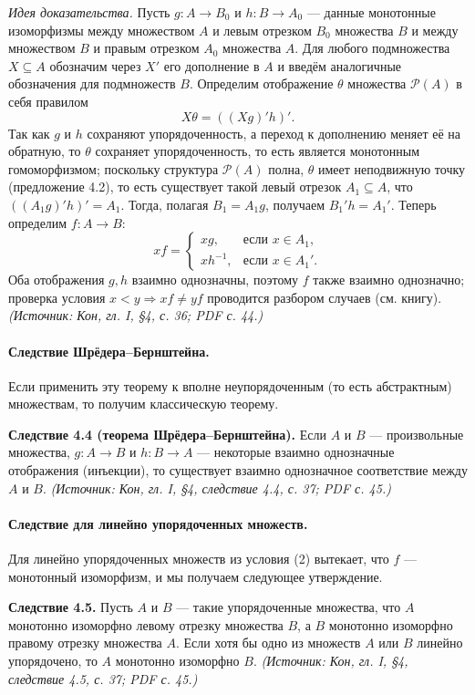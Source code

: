 \documentclass[a4paper,12pt]{article}
\begin{document}
\emph{Идея доказательства.} Пусть \(g\colon A\to B_0\) и \(h\colon B\to A_0\) — данные монотонные изоморфизмы между множеством \(A\) и левым отрезком \(B_0\) множества \(B\) и между множеством \(B\) и правым отрезком \(A_0\) множества \(A\). Для любого подмножества \(X\subseteq A\) обозначим через \(X'\) его дополнение в \(A\) и введём аналогичные обозначения для подмножеств \(B\). Определим отображение \(\theta\) множества \(\mathcal{P}(A)\) в себя правилом
\[
X\theta=((Xg)'h)'.
\]
Так как \(g\) и \(h\) сохраняют упорядоченность, а переход к дополнению меняет её на обратную, то \(\theta\) сохраняет упорядоченность, то есть является монотонным гомоморфизмом; поскольку структура \(\mathcal{P}(A)\) полна, \(\theta\) имеет неподвижную точку (предложение 4.2), то есть существует такой левый отрезок \(A_1\subseteq A\), что \(((A_1g)'h)'=A_1\). Тогда, полагая \(B_1=A_1g\), получаем \(B_1'h=A_1'\). Теперь определим \(f\colon A\to B\):
\[
xf=\begin{cases}
xg, & \text{если }x\in A_1,\\
xh^{-1}, & \text{если }x\in A_1'.
\end{cases}
\]
Оба отображения \(g,h\) взаимно однозначны, поэтому \(f\) также взаимно однозначно; проверка условия \(x<y\Rightarrow xf\ne yf\) проводится разбором случаев (см. книгу).
\textit{(Источник: Кон, гл. I, §4, с. 36; PDF с. 44.)}

\paragraph{Следствие Шрёдера--Бернштейна.}
Если применить эту теорему к вполне неупорядоченным (то есть абстрактным) множествам, то получим классическую теорему.

\textbf{Следствие 4.4 (теорема Шрёдера--Бернштейна).} Если \(A\) и \(B\) — произвольные множества, \(g\colon A\to B\) и \(h\colon B\to A\) — некоторые взаимно однозначные отображения (инъекции), то существует взаимно однозначное соответствие между \(A\) и \(B\).
\textit{(Источник: Кон, гл. I, §4, следствие 4.4, с. 37; PDF с. 45.)}

\paragraph{Следствие для линейно упорядоченных множеств.}
Для линейно упорядоченных множеств из условия (2) вытекает, что \(f\) — монотонный изоморфизм, и мы получаем следующее утверждение.

\textbf{Следствие 4.5.} Пусть \(A\) и \(B\) — такие упорядоченные множества, что \(A\) монотонно изоморфно левому отрезку множества \(B\), а \(B\) монотонно изоморфно правому отрезку множества \(A\). Если хотя бы одно из множеств \(A\) или \(B\) линейно упорядочено, то \(A\) монотонно изоморфно \(B\).
\textit{(Источник: Кон, гл. I, §4, следствие 4.5, с. 37; PDF с. 45.)}
\end{document}
